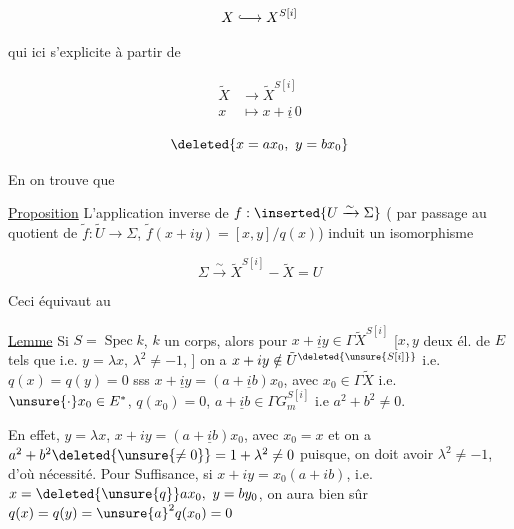 \[
X\lhook\joinrel\longrightarrow X^{S[i]}
\]

qui ici s'explicite à partir de

\[
\begin{aligned}\tilde X&\longrightarrow\tilde X^{S[i]}\\ x&\longmapsto x+\underline i\,0\end{aligned}
\]


\[
\deleted{x=ax_0,\ y=bx_0}
\]

En  on trouve que

\uline{Proposition} L'application inverse de $f:\inserted{U\xrightarrow{\sim}\Sigma}$ ( par passage au quotient de $\tilde f:\tilde U\to\Sigma$, $\tilde f(x+iy)=[x,y]/q(x)$) induit un isomorphisme

\[
\boxed{\Sigma\xrightarrow{\sim}\tilde X^{S[i]}-\tilde X=U}
\]

Ceci équivaut au 

\uline{Lemme} Si $S=\operatorname{Spec} k$, $k$ un corps,  alors pour  $x+\underline i y\in\Gamma\tilde X^{S[i]}$ [$x,y$ deux él. de $E$  tels que    i.e. $y=\lambda x$,   $\lambda^2\ne-1$, ]  \unsure{;|,} on a $x+iy\notin\tilde U^{\deleted{\unsure{S[i]}}}$ i.e. $q(x)=q(y)=0$ sss $x+\underline i y=(a+\underline i b)x_0$, avec $x_0\in\Gamma\tilde X$ i.e. $\unsure{\cdot}x_0\in E^{*}$, $q(x_0)=0$,  $a+\underline i b\in\Gamma G_m^{S[i]}$ i.e $a^2+b^2\ne0$.


En effet,  $y=\lambda x$,  $x+iy=(a+\underline i b)x_0$,  avec $x_0=x$  et on a $a^2+b^2\deleted{\unsure{\ne0}}=1+\lambda^2\ne0$ puisque, on doit avoir $\lambda^2\ne-1$, d'où nécessité. Pour Suffisance, si $x+iy=x_0(a+ib)$, i.e. $x=\deleted{\unsure{q}}ax_0,\ y=by_0$, on aura bien sûr $q(x)=q(y)={\unsure{a}}^{2}q(x_0)=0$

